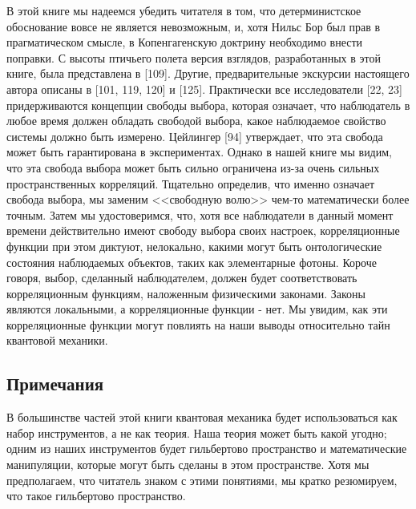 \documentclass[main.tex]{subfiles}
\begin{document}
В этой книге мы надеемся убедить читателя в том, что детерминистское обоснование вовсе не является невозможным, и, хотя Нильс Бор был прав в прагматическом смысле, в Копенгагенскую доктрину необходимо внести поправки. С высоты птичьего полета версия взглядов, разработанных в этой книге, была представлена в [109]. Другие, предварительные экскурсии настоящего автора описаны в [101, 119, 120] и [125]. Практически все исследователи [22, 23] придерживаются концепции свободы выбора, которая означает, что наблюдатель в любое время должен обладать свободой выбора, какое наблюдаемое свойство системы должно быть измерено. Цейлингер [94] утверждает, что эта свобода может быть гарантирована в экспериментах. 
Однако в нашей книге мы видим, что эта свобода выбора может быть сильно ограничена из-за очень сильных пространственных корреляций. Тщательно определив, что именно означает свобода выбора, мы заменим <<свободную волю>> чем-то математически более точным. Затем мы удостоверимся, что, хотя все наблюдатели в данный момент времени действительно имеют свободу выбора своих настроек, корреляционные функции при этом диктуют, нелокально, какими могут быть онтологические состояния наблюдаемых объектов, таких как элементарные фотоны. Короче говоря, выбор, сделанный наблюдателем, должен будет соответствовать корреляционным функциям, наложенным физическими законами. Законы являются локальными, а корреляционные функции - нет. Мы увидим, как эти корреляционные функции могут повлиять на наши выводы относительно тайн квантовой механики.  

\subsection{Примечания}\label{ch1.6}

В большинстве частей этой книги квантовая механика будет использоваться как набор инструментов, а не как теория. Наша теория может быть какой угодно; одним из наших инструментов будет гильбертово пространство и математические манипуляции, которые могут быть сделаны в этом пространстве. Хотя мы предполагаем, что читатель знаком с этими понятиями, мы кратко резюмируем, что такое гильбертово пространство. 
\end{document}
